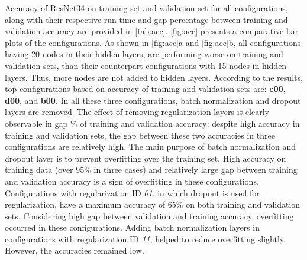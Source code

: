 Accuracy of ResNet34 on training set and validation set for all configurations, along with their respective run time and gap percentage between training and validation accuracy are provided in \cref{tab:acc}. \cref{fig:acc} presents a comparative bar plots of the configurations. As shown in \cref{fig:acc}a and \cref{fig:acc}b, all configurations having 20 nodes in their hidden layers, are performing worse on training and validation sets, than their counterpart configurations with 15 nodes in hidden layers. Thus, more nodes are not added to hidden layers. According to the results, top configurations based on accuracy of training and validation sets are: \textbf{c00}, \textbf{d00}, and \textbf{b00}. In all these three configurations, batch normalization and dropout layers are removed. The effect of removing regularization layers is clearly observable in gap \% of training and validation accuracy: despite high accuracy in training and validation sets, the gap between these two accuracies in three configurations are relatively high. The main purpose of batch normalization and dropout layer is to prevent overfitting over the training set. High accuracy on training data (over 95\% in three cases) and relatively large gap between training and validation accuracy is a sign of overfitting in these configurations. Configurations with regularization ID \textit{01}, in which dropout is used for regularization, have a maximum accuracy of 65\% on both training and validation sets. Considering high gap between validation and training accuracy, overfitting occurred in these configurations.  Adding batch normalization layers in configurations with regularization ID \textit{11}, helped to reduce overfitting slightly. However, the accuracies remained low.

